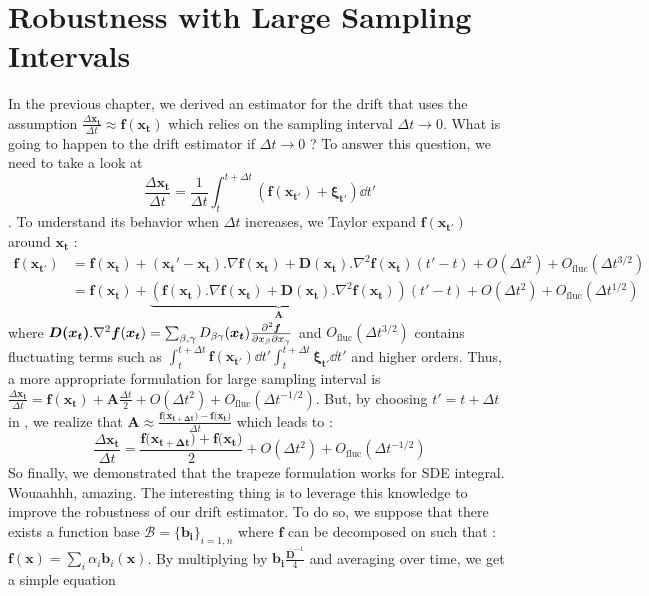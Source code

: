 \section{Robustness with Large Sampling Intervals}
In the previous chapter, we derived an estimator for the drift that uses the assumption $\frac{\Delta \bm{x_t}}{\Delta t} \approx \bm{f}(\bm{x_t})$ which relies on the sampling interval $\Delta t \to 0$. What is going to happen to the drift estimator if $\Delta t \to 0$ ? To answer this question, we need to take a look at 
\begin{equation}
    \frac{\Delta\bm{x_t}}{\Delta t} = \frac{1}{\Delta t}\int_t^{t+\Delta t} \left(\bm{f}(\bm{x_{t'}}) + \bm{\xi_{t'}} \right)\dd{t'}
    \label{eq:delta_x}
\end{equation}. To understand its behavior when $\Delta t$ increases, we Taylor expand $\bm{f}(\bm{x_{t'}})$ around $\bm{x_t}$ :
\begin{align}
    \bm{f}(\bm{x_{t'}}) &= \bm{f}(\bm{x_t}) + (\bm{x_t'} - \bm{x_{t}}).\nabla \bm{f}(\bm{x_t}) + \bm{D(x_t)}.\nabla^2\bm{f}(\bm{x_t}) (t'-t) + O(\Delta t^2) + O_\text{fluc}(\Delta t^{3/2})\\
    &= \bm{f}(\bm{x_t}) + \underbrace{\left(\bm{f}(\bm{x_t}).\nabla \bm{f}(\bm{x_t}) + \bm{D(x_t)}.\nabla^2\bm{f}(\bm{x_t})\right)}_{\bm{A}} (t'-t)  +O(\Delta t^2) + O_\text{fluc}(\Delta t^{1/2})
    \label{eq:Taylor_b}
\end{align}
where $\bm{D(x_t)}.\nabla^2\bm{f}(\bm{x_t})  = \sum_{\beta, \gamma} D_{\beta\gamma}(\bm{x_t})\pdv{\bm{f}}{x_{\beta}}{x_{\gamma}}$ and $O_\text{fluc}(\Delta t^{3/2})$ contains fluctuating terms such as $\int_t^{t+\Delta t}\bm{f(x_{t'})} \dd{t'} \int_t^{t+\Delta t}\bm{\xi_{t'}} \dd{t'}$ and higher orders. Thus, a more appropriate formulation for large sampling interval is $\frac{\Delta\bm{x_t}}{\Delta t} = \bm{f}(\bm{x_t}) + \bm{A} \frac{\Delta t}{2} + O(\Delta t^2) + O_\text{fluc}(\Delta t^{-1/2})$. But, by choosing $t'= t + \Delta t$ in , we realize that $\bm{A} \approx \frac{\bm{f}(\bm{x_{t+ \Delta t})} - \bm{f}(\bm{x_t)}}{\Delta t}$ which leads to :
\begin{equation}
    \frac{\Delta\bm{x_t}}{\Delta t} = \frac{\bm{f}(\bm{x_{t+\Delta t})} + \bm{f}(\bm{x_t)}}{2}  + O(\Delta t^2) + O_\text{fluc}(\Delta t^{-1/2})
    \label{eq:delta_x_trapeze}
\end{equation}
So finally, we demonstrated that the trapeze formulation works for SDE integral. Wouaahhh, amazing. The interesting thing is to leverage this knowledge to improve the robustness of our drift estimator. To do so, we suppose that there exists a function base $\mathcal{B} = \{\bm{b_i}\}_{i=1,n}$ where $\bm{f}$ can be decomposed on such that : $\bm{f}(\bm{x}) = \sum_i \alpha_i\bm{b}_i(\bm{x})$. By multiplying  by $\bm{b_i} \frac{\bm{\bar{D}}^{-1}}{4}$ and averaging over time, we get a simple equation 
